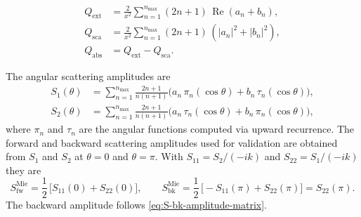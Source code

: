 \documentclass[11pt,a4paper]{article}
\begin{document}
\begin{align}
  Q_{\text{ext}} &= \frac{2}{x^2}\sum_{n=1}^{n_{\max}}
                     (2n+1)\,\operatorname{Re}(a_n + b_n),
  \label{eq:Q-ext-mie} \\
  Q_{\text{sca}} &= \frac{2}{x^2}\sum_{n=1}^{n_{\max}}
                     (2n+1)\,(|a_n|^2 + |b_n|^2),
  \label{eq:Q-sca-mie} \\
  Q_{\text{abs}} &= Q_{\text{ext}} - Q_{\text{sca}}.
  \label{eq:Q-abs-mie}
\end{align}

The angular scattering amplitudes are~\cite{Bohren1983}
\begin{align}
  S_1(\theta)
    &= \sum_{n=1}^{n_{\max}} \frac{2n+1}{n(n+1)}
       \bigl(a_n\,\pi_n(\cos\theta) + b_n\,\tau_n(\cos\theta)\bigr),
  \label{eq:S1-mie} \\
  S_2(\theta)
    &= \sum_{n=1}^{n_{\max}} \frac{2n+1}{n(n+1)}
       \bigl(a_n\,\tau_n(\cos\theta) + b_n\,\pi_n(\cos\theta)\bigr),
  \label{eq:S2-mie}
\end{align}
where $\pi_n$ and $\tau_n$ are the angular functions computed via
upward recurrence.
The forward and backward scattering amplitudes used for validation
are obtained from $S_1$ and $S_2$ at $\theta = 0$ and $\theta = \pi$.
With $S_{11} = S_2 / (-ik)$ and $S_{22} = S_1 / (-ik)$ they are
\begin{equation}
  S_{\text{fw}}^{\text{Mie}}
    = \frac{1}{2}\,\bigl[S_{11}(0) + S_{22}(0)\bigr],
  \qquad
  S_{\text{bk}}^{\text{Mie}}
    = \frac{1}{2}\,\bigl[-S_{11}(\pi) + S_{22}(\pi)\bigr]
    = S_{22}(\pi) .
  \label{eq:S-mie-observables}
\end{equation}
The backward amplitude follows \eqref{eq:S-bk-amplitude-matrix}.
\end{document}
